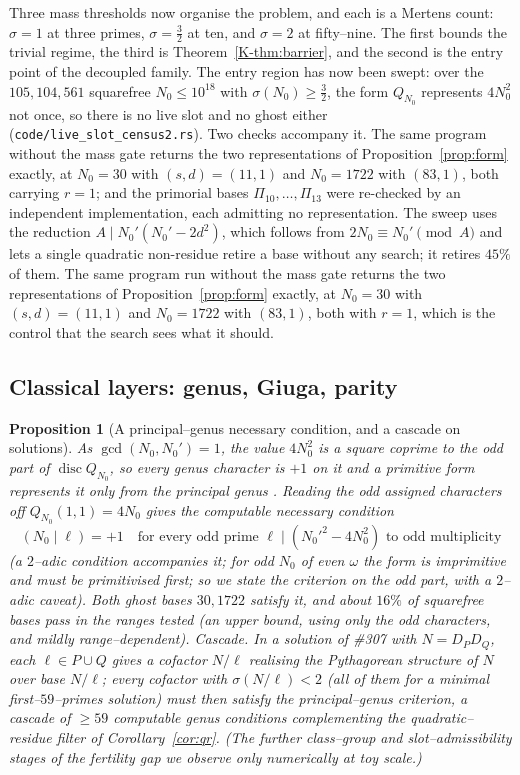 \documentclass[11pt]{article}
\newtheorem{proposition}[theorem]{Proposition}
\theoremstyle{definition}
\begin{document}
Three mass thresholds now organise the problem, and each is a Mertens count: $\sigma=1$ at three
primes, $\sigma=\tfrac32$ at ten, and $\sigma=2$ at fifty--nine. The first bounds the trivial regime,
the third is Theorem~\ref{K-thm:barrier}, and the second is the entry point of the decoupled family. The
entry region has now been swept: over the $105{,}104{,}561$ squarefree $N_0\le10^{18}$ with
$\sigma(N_0)\ge\tfrac32$, the form $Q_{N_0}$ represents $4N_0^2$ not once, so there is no live slot
and no ghost either \textup{(\texttt{code/live\_slot\_census2.rs})}. Two checks accompany it. The
same program without the mass gate returns the two representations of Proposition~\ref{prop:form}
exactly, at $N_0=30$ with $(s,d)=(11,1)$ and $N_0=1722$ with $(83,1)$, both carrying $r=1$; and the
primorial bases $\Pi_{10},\dots,\Pi_{13}$ were re-checked by an independent implementation, each
admitting no representation. The sweep uses the reduction $A\mid N_0'(N_0'-2d^2)$, which follows
from $2N_0\equiv N_0'\pmod A$ and lets a single quadratic non-residue retire a base without any
search; it retires $45\%$ of them. The same program run without the
mass gate returns the two representations of Proposition~\ref{prop:form} exactly, at $N_0=30$ with
$(s,d)=(11,1)$ and $N_0=1722$ with $(83,1)$, both with $r=1$, which is the control that the search
sees what it should.

\subsection{Classical layers: genus, Giuga, parity}\label{ssec:classical}

\begin{proposition}[A principal--genus necessary condition, and a cascade on solutions]\label{prop:genus}
As $\gcd(N_0,N_0')=1$, the value $4N_0^2$ is a square coprime to the odd part of $\operatorname{disc}
Q_{N_0}$, so every genus character is $+1$ on it and a primitive form represents it only from the
principal genus \cite{Cox}. Reading the odd assigned characters off $Q_{N_0}(1,1)=4N_0$ gives the
computable necessary condition
\[ (N_0\mid\ell)=+1 \quad\text{for every odd prime }\ell\mid (N_0'^2-4N_0^2)\text{ to odd multiplicity} \]
(a $2$--adic condition accompanies it; for odd $N_0$ of even $\omega$ the form is imprimitive and must be
primitivised first; so we state the criterion on the odd part, with a $2$--adic caveat). Both ghost
bases $30,1722$ satisfy it, and about $16\%$ of squarefree bases pass in the ranges tested (an
\emph{upper bound}, using only the odd characters, and mildly range--dependent). \emph{Cascade.} In a
solution of \#307 with $N=D_PD_Q$, each $\ell\in P\cup Q$ gives a cofactor $N/\ell$ realising the
Pythagorean structure of $N$ over base $N/\ell$; every cofactor with $\sigma(N/\ell)<2$ (all of them
for a minimal first--$59$--primes solution) must then satisfy the principal--genus criterion, a
cascade of $\ge59$ computable genus conditions complementing the quadratic--residue filter of
Corollary~\ref{cor:qr}. \textup{(The further class--group and slot--admissibility stages of the
fertility gap we observe only numerically at toy scale.)}
\end{proposition}
\end{document}
